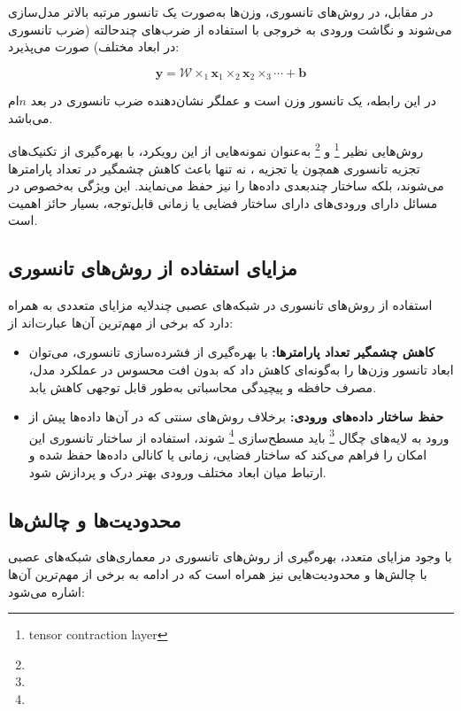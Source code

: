 در مقابل، در روش‌های تانسوری، وزن‌ها به‌صورت یک تانسور مرتبه بالاتر مدل‌سازی می‌شوند و نگاشت ورودی به خروجی با استفاده از ضرب‌های چندحالته (ضرب تانسوری در ابعاد مختلف) صورت می‌پذیرد:

\[
\mathbf{y} = \mathcal{W} \times_1 \mathbf{x}_1 \times_2 \mathbf{x}_2 \times_3 \cdots + \mathbf{b}
\]

در این رابطه،  یک تانسور وزن است و عملگر  نشان‌دهنده ضرب تانسوری در بعد $n$‌ام می‌باشد.

روش‌هایی نظیر  \footnote{tensor contraction layer} و  \footnote{} به‌عنوان نمونه‌هایی از این رویکرد، با بهره‌گیری از تکنیک‌های تجزیه تانسوری همچون  یا تجزیه ، نه تنها باعث کاهش چشمگیر در تعداد پارامترها می‌شوند، بلکه ساختار چندبعدی داده‌ها را نیز حفظ می‌نمایند. این ویژگی به‌خصوص در مسائل دارای ورودی‌های دارای ساختار فضایی یا زمانی قابل‌توجه، بسیار حائز اهمیت است.


\subsection*{مزایای استفاده از روش‌های تانسوری}

استفاده از روش‌های تانسوری در شبکه‌های عصبی چندلایه مزایای متعددی به همراه دارد که برخی از مهم‌ترین آن‌ها عبارت‌اند از:

\begin{itemize}
	\item \textbf{کاهش چشمگیر تعداد پارامترها:} با بهره‌گیری از فشرده‌سازی تانسوری، می‌توان ابعاد تانسور وزن‌ها را به‌گونه‌ای کاهش داد که بدون افت محسوس در عملکرد مدل، مصرف حافظه و پیچیدگی محاسباتی به‌طور قابل توجهی کاهش یابد.
	
	\item \textbf{حفظ ساختار داده‌های ورودی:} برخلاف روش‌های سنتی که در آن‌ها داده‌ها پیش از ورود به لایه‌های چگال \footnote{} باید مسطح‌سازی \footnote{} شوند، استفاده از ساختار تانسوری این امکان را فراهم می‌کند که ساختار فضایی، زمانی یا کانالی داده‌ها حفظ شده و ارتباط میان ابعاد مختلف ورودی بهتر درک و پردازش شود.
	
	
	
\end{itemize}


\subsection*{محدودیت‌ها و چالش‌ها}

با وجود مزایای متعدد، بهره‌گیری از روش‌های تانسوری در معماری‌های شبکه‌های عصبی با چالش‌ها و محدودیت‌هایی نیز همراه است که در ادامه به برخی از مهم‌ترین آن‌ها اشاره می‌شود:

